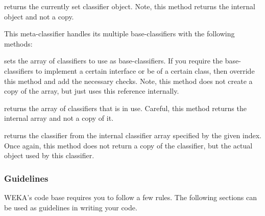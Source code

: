 returns the currently set classifier object. Note, this method returns the
internal object and not a copy.

This meta-classifier handles its multiple base-classifiers with the following
methods:

sets the array of classifiers to use as base-classifiers. If you require the
base-classifiers to implement a certain interface or be of a certain class, then
override this method and add the necessary checks. Note, this method does not
create a copy of the array, but just uses this reference internally.

returns the array of classifiers that is in use. Careful, this method returns
the internal array and not a copy of it.

returns the classifier from the internal classifier array specified by the given
index. Once again, this method does not return a copy of the classifier, but the
actual object used by this classifier.

\newpage
\subsubsection{Guidelines}
WEKA's code base requires you to follow a few rules. The following sections can
be used as guidelines in writing your code.

